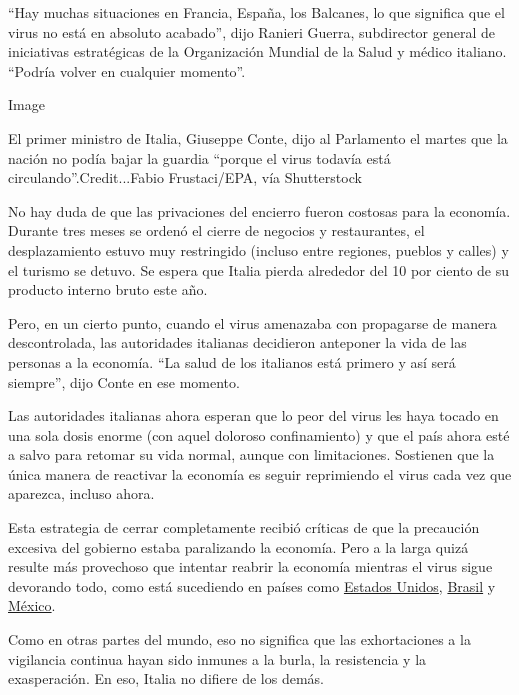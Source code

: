 ``Hay muchas situaciones en Francia, España, los Balcanes, lo que
significa que el virus no está en absoluto acabado'', dijo Ranieri
Guerra, subdirector general de iniciativas estratégicas de la
Organización Mundial de la Salud y médico italiano. ``Podría volver en
cualquier momento''.

Image

El primer ministro de Italia, Giuseppe Conte, dijo al Parlamento el
martes que la nación no podía bajar la guardia ``porque el virus todavía
está circulando''.Credit...Fabio Frustaci/EPA, vía Shutterstock

No hay duda de que las privaciones del encierro fueron costosas para la
economía. Durante tres meses se ordenó el cierre de negocios y
restaurantes, el desplazamiento estuvo muy restringido (incluso entre
regiones, pueblos y calles) y el turismo se detuvo. Se espera que Italia
pierda alrededor del 10 por ciento de su producto interno bruto este
año.

Pero, en un cierto punto, cuando el virus amenazaba con propagarse de
manera descontrolada, las autoridades italianas decidieron anteponer la
vida de las personas a la economía. ``La salud de los italianos está
primero y así será siempre'', dijo Conte en ese momento.

Las autoridades italianas ahora esperan que lo peor del virus les haya
tocado en una sola dosis enorme (con aquel doloroso confinamiento) y que
el país ahora esté a salvo para retomar su vida normal, aunque con
limitaciones. Sostienen que la única manera de reactivar la economía es
seguir reprimiendo el virus cada vez que aparezca, incluso ahora.

Esta estrategia de cerrar completamente recibió críticas de que la
precaución excesiva del gobierno estaba paralizando la economía. Pero a
la larga quizá resulte más provechoso que intentar reabrir la economía
mientras el virus sigue devorando todo, como está sucediendo en países
como
\href{https://www.nytimes3xbfgragh.onion/2020/03/13/us/coronavirus-deaths-estimate.html}{Estados
Unidos},
\href{https://www.nytimes3xbfgragh.onion/article/brazil-coronavirus-cases.html}{Brasil}
y
\href{https://www.nytimes3xbfgragh.onion/es/2020/06/05/espanol/america-latina/amlo-mexico-muertes-coronavirus.html}{México}.

Como en otras partes del mundo, eso no significa que las exhortaciones a
la vigilancia continua hayan sido inmunes a la burla, la resistencia y
la exasperación. En eso, Italia no difiere de los demás.

